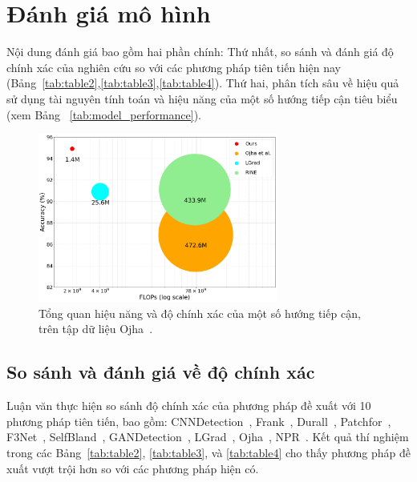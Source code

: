 

\section{Đánh giá mô hình}
%
Nội dung đánh giá bao gồm hai phần chính: Thứ nhất, so sánh và đánh giá độ chính xác của nghiên cứu so với các phương pháp tiên tiến hiện nay (Bảng~\ref{tab:table2},\ref{tab:table3},\ref{tab:table4}). Thứ hai, phân tích sâu về hiệu quả sử dụng tài nguyên tính toán và hiệu năng của một số hướng tiếp cận tiêu biểu (xem Bảng ~\ref{tab:model_performance}).
%
%
%
\begin{figure}[ht!]
	\centering
	\includegraphics[width=0.7\textwidth]{Images/tease.png}
	\caption{Tổng quan hiệu năng và độ chính xác của một số hướng tiếp cận, trên tập dữ liệu Ojha~\cite{Ojha2023TowardsUF}.}
	\label{fig:teaser}
\end{figure}
\subsection{So sánh và đánh giá về độ chính xác}
%
Luận văn thực hiện so sánh độ chính xác của phương pháp đề xuất với 10 phương pháp tiên tiến, bao gồm: 
CNNDetection~\cite{Wang2019CNNGeneratedIA}, 
Frank~\cite{Frank2020LeveragingFA}, 
Durall~\cite{Durall2020WatchYU}, 
Patchfor~\cite{Chai2020WhatMF}, 
F3Net~\cite{Qian2020ThinkingIF}, 
SelfBland~\cite{Shiohara2022DetectingDW}, 
GANDetection~\cite{Mandelli2022DetectingGI}, 
LGrad~\cite{Tan2023LearningOG}, 
Ojha~\cite{Ojha2023TowardsUF}, 
NPR~\cite{Tan2023RethinkingTU}. 
Kết quả thí nghiệm trong các Bảng~\ref{tab:table2}, \ref{tab:table3}, và \ref{tab:table4} cho thấy phương pháp đề xuất vượt trội hơn so với các phương pháp hiện có. 


